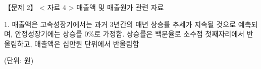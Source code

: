 \begin{longquestion}{【문제 2】}
< 자료 4 > 매출액 및 매출원가 관련 자료 \par
1. 매출액은 고속성장기에서는 과거 3년간의 매년 상승률 추세가 지속될 것으로 예측되며, 안정성장기에는 상승률 0\%로 가정함. 상승률은 백분율로 소수점 첫째자리에서 반올림하고, 매출액은 십만원 단위에서 반올림함 \par
(단위: 원) \par
{\small\centering
{}\par}


\end{longquestion}
